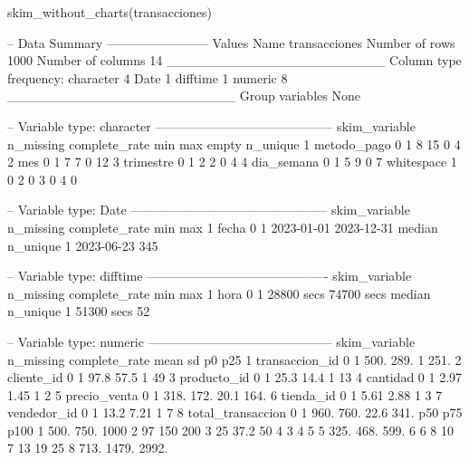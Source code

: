 \begin{rcode}
skim_without_charts(transacciones)
\end{rcode}
\begin{rsalida}
-- Data Summary ------------------------
                           Values
Name                       transacciones
Number of rows             1000
Number of columns          14
_______________________
Column type frequency:
  character                4
  Date                     1
  difftime                 1
  numeric                  8
________________________
Group variables            None

-- Variable type: character ------------------------------------------
  skim_variable n_missing complete_rate min max empty n_unique
1 metodo_pago           0             1   8  15     0        4
2 mes                   0             1   7   7     0       12
3 trimestre             0             1   2   2     0        4
4 dia_semana            0             1   5   9     0        7
  whitespace
1          0
2          0
3          0
4          0

-- Variable type: Date -----------------------------------------------
  skim_variable n_missing complete_rate min        max
1 fecha                 0             1 2023-01-01 2023-12-31
  median     n_unique
1 2023-06-23      345

-- Variable type: difftime -------------------------------------------
  skim_variable n_missing complete_rate min        max
1 hora                  0             1 28800 secs 74700 secs
  median     n_unique
1 51300 secs       52

-- Variable type: numeric --------------------------------------------
  skim_variable     n_missing complete_rate   mean     sd   p0  p25
1 transaccion_id            0             1 500.   289.    1   251.
2 cliente_id                0             1  97.8   57.5   1    49
3 producto_id               0             1  25.3   14.4   1    13
4 cantidad                  0             1   2.97   1.45  1     2
5 precio_venta              0             1 318.   172.   20.1 164.
6 tienda_id                 0             1   5.61   2.88  1     3
7 vendedor_id               0             1  13.2    7.21  1     7
8 total_transaccion         0             1 960.   760.   22.6 341.
   p50    p75  p100
1 500.  750.  1000
2  97   150    200
3  25    37.2   50
4   3     4      5
5 325.  468.   599.
6   6     8     10
7  13    19     25
8 713. 1479.  2992.
\end{rsalida}

